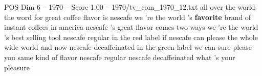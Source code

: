 \begin{textsample}{POS Dim 6 – 1970 – Score 1.00 – 1970/tv\_com\_1970\_12.txt}  \label{ex:f6_pos_039}
all over the world the word for great coffee flavor is nescafe we 're the world 's \textbf{favorite} brand of instant coffees in america nescafe 's great flavor comes two ways we 're the world 's best selling tool nescafe regular in the red label if nescafe can please the whole wide world and now nescafe decaffeinated in the green label we can sure please you same kind of flavor nescafe regular nescafe decaffeinated what 's your pleasure

\end{textsample}
